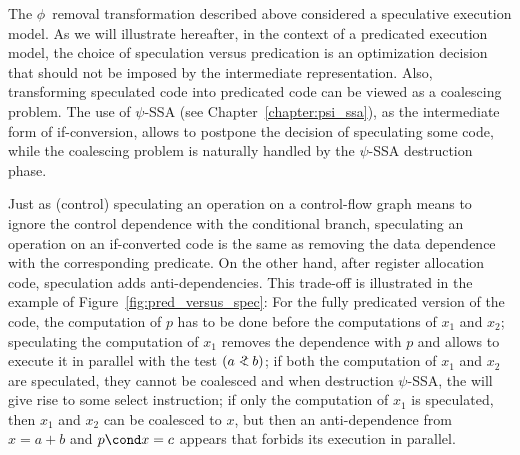 The $\phi$~removal transformation described above considered a speculative execution model. 
As we will illustrate hereafter, in the context of a predicated execution model, the choice of speculation versus predication is an optimization decision that should not be imposed by the intermediate representation. 
Also, transforming speculated code into predicated code can be viewed as a coalescing problem. 
The use of $\psi$-SSA (see Chapter~\ref{chapter:psi_ssa}), as the intermediate form of if-conversion, allows to postpone the decision of speculating some code, while the coalescing problem is naturally handled by the $\psi$-SSA destruction phase.

Just as (control) speculating an operation on a control-flow graph means to ignore the control dependence with the conditional branch, speculating an operation on an if-converted code is the same as removing the data dependence with the corresponding predicate. 
On the other hand, after register allocation code, speculation adds anti-dependencies. 
This trade-off is illustrated in the example of Figure~\ref{fig:pred_versus_spec}: 
For the fully predicated version of the code, the computation of $p$ has to be done before the computations of $x_1$ and $x_2$; 
speculating the computation of $x_1$ removes the dependence with $p$ and allows to execute it in parallel with the test $(a<\hspace{-.6em}?\ b)$; 
if both the computation of $x_1$ and $x_2$ are speculated, they cannot be coalesced and when destruction $\psi$-SSA, the \psifun\index{\psifun} will give rise to some select instruction; 
if only the computation of $x_1$ is speculated, then $x_1$ and $x_2$ can be coalesced to $x$, but then an anti-dependence from $x=a+b$ and $p\cond x = c $ appears that forbids its execution in parallel.

